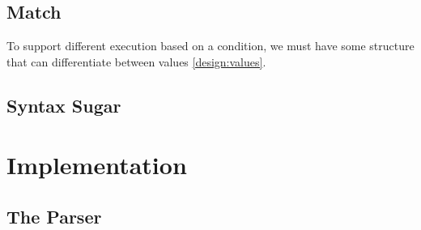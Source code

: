 \subsection{Match}
To support different execution based on a condition, we must have some structure that can differentiate between values \ref{design:values}. 

\subsection{Syntax Sugar}

\section{Implementation}
\subsection{The Parser}
